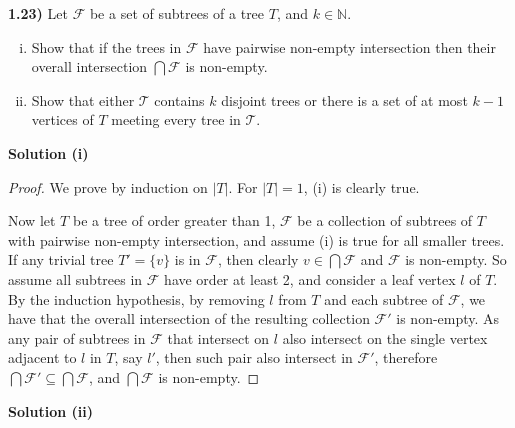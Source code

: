 \documentclass[11pt]{article}
\theoremstyle{plain}
\begin{document}
\textbf{1.23)} Let $\mathcal{F}$ be a set of subtrees of a tree $T$, and $k \in \mathbb{N}$.

\begin{enumerate}[(i)]
\item Show that if the trees in $\mathcal{F}$ have pairwise non-empty intersection then their overall intersection $\bigcap \mathcal{F}$ is non-empty.
\item Show that either $\mathcal{T}$ contains $k$ disjoint trees or there is a set of at most $k-1$ vertices of $T$ meeting every tree in $\mathcal{T}$.
\end{enumerate}

\noindent \textbf{Solution (i)}
\begin{proof}
We prove by induction on $|T|$. For $|T|=1$, (i) is clearly true.

Now let $T$ be a tree of order greater than 1, $\mathcal{F}$ be a collection of subtrees of $T$ with pairwise non-empty intersection, and assume (i) is true for all smaller trees. If any trivial tree $T' = \{v\}$ is in $\mathcal{F}$, then clearly $v \in \bigcap \mathcal{F}$ and $\mathcal{F}$ is non-empty. So assume all subtrees in $\mathcal{F}$ have order at least 2, and consider a leaf vertex $l$ of $T$. By the induction hypothesis, by removing $l$ from $T$ and each subtree of $\mathcal{F}$, we have that the overall intersection of the resulting collection $\mathcal{F'}$ is non-empty. As any pair of subtrees in $\mathcal{F}$ that intersect on $l$ also intersect on the single vertex adjacent to $l$ in $T$, say $l'$, then such pair also intersect in $\mathcal{F'}$, therefore $\bigcap \mathcal{F'} \subseteq \bigcap \mathcal{F}$, and $\bigcap \mathcal{F}$ is non-empty.
\end{proof}


\noindent \textbf{Solution (ii)}
\end{document}
